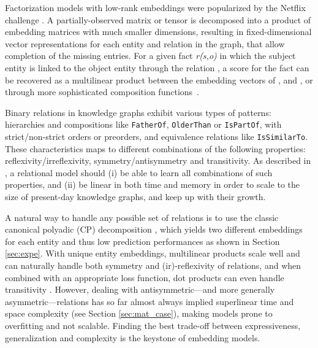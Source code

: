 \documentclass[twoside,11pt]{article}
\renewcommand{\cite}{\citep}
\def\tt{\texttt}
\begin{document}
Factorization models with low-rank embeddings were popularized by the Netflix challenge \cite{koren_netflix}. A partially-observed matrix or tensor is decomposed into a product of embedding matrices with much smaller dimensions, resulting in fixed-dimensional vector representations for each entity and relation in the graph, that allow completion of the missing entries.
For a given fact \emph{r(s,o)} in which the subject entity  is linked to the object entity  through the relation , a score for the fact can be recovered as a multilinear product between the embedding vectors of ,  and , or through more sophisticated
composition functions~\cite{nickel_2016_review}.




Binary relations in knowledge graphs exhibit various types of patterns: hierarchies and compositions like \tt{FatherOf}, \tt{OlderThan} or \tt{IsPartOf}, with strict/non-strict orders or preorders, and  equivalence relations like \tt{IsSimilarTo}. These characteristics maps to different combinations of the following properties: reflexivity/irreflexivity, symmetry/antisymmetry and transitivity. As described in \citet{Bordes2013}, a relational model should (i) be able to learn all combinations of such properties, and (ii) be linear in both time and memory in order to scale to the size of present-day knowledge graphs, and keep up with their growth. 

A natural way to handle any possible set of relations is to use the classic canonical
polyadic (CP) decomposition \cite{hitchcock-sum-1927}, which yields two different embeddings
for each entity and thus low prediction performances as shown in Section \ref{sec:expe}.
With unique entity embeddings, multilinear products scale well and can naturally handle both symmetry and (ir)-reflexivity of relations, and when combined with an appropriate loss function, dot products can even handle transitivity \cite{bouchard2015approximate}.
However, dealing with antisymmetric---and more generally asymmetric---relations has so far almost always implied superlinear time and space complexity \cite{Nickel2011,socher2013reasoning} (see Section \ref{sec:mat_case}), making models prone to overfitting and not scalable. Finding the best trade-off between expressiveness, generalization and complexity is the keystone of embedding models.
\end{document}
